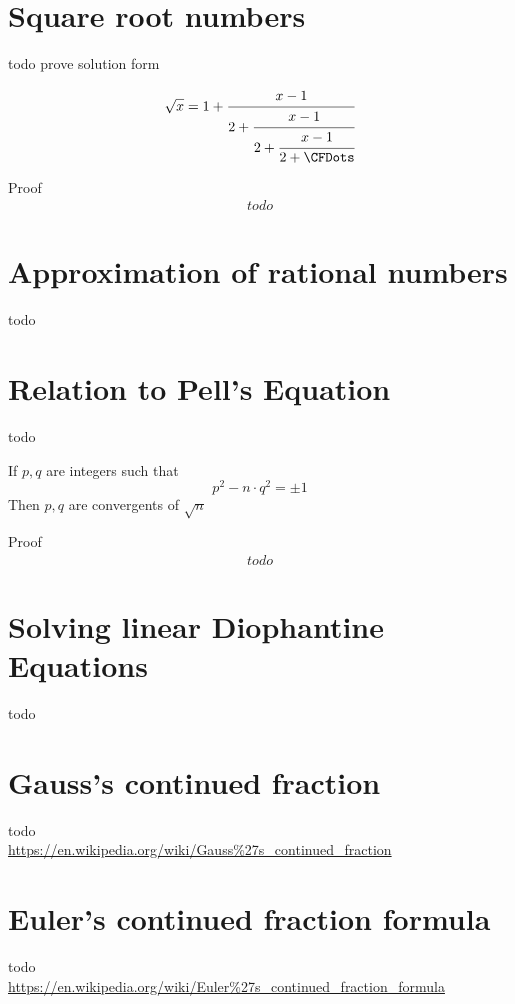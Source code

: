 \documentclass[a4paper]{article}
\begin{document}
    \section{Square root numbers}\label{sec:square-root-numbers}
    todo prove solution form

    \begin{theorem}
        \[
        \sqrt{x} = 1 + \cfrac{x-1}{2 +\cfrac{x-1}{2 +\cfrac{x-1}{2 + \CFDots}}}
        \]

        Proof
        \begin{gather*}
            todo
        \end{gather*}
    \end{theorem}


    \section{Approximation of rational numbers}\label{sec:approximation-of-rational-numbers}
    todo


    \section{Relation to Pell's Equation}\label{sec:relation-to-pell's-equation}
    todo

    \begin{theorem}
        If $p,q$ are integers such that
        \[
        p^2 - n \cdot q^2 =  \pm 1
        \]
        Then $p,q$ are convergents of $\sqrt{n}$

        Proof
        \begin{gather*}
            todo
        \end{gather*}
    \end{theorem}


    \section{Solving linear Diophantine Equations}\label{sec:solving-linear-diophantine-equations}
    todo


    \section{Gauss's continued fraction}\label{sec:gauss's-continued-fraction}
    todo \\
    \url{https://en.wikipedia.org/wiki/Gauss%27s_continued_fraction}


    \section{Euler's continued fraction formula}
    todo \\
    \url{https://en.wikipedia.org/wiki/Euler%27s_continued_fraction_formula}
\end{document}
